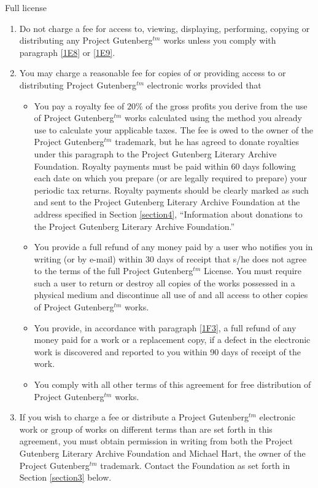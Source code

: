 \begin{chapter}{Full license}
\begin{enumerate}
\begin{enumerate}
\item \label{1E7}Do not charge a fee for access to, viewing, displaying,
performing, copying or distributing any Project Gutenberg$^{tm}$ works
unless you comply with paragraph \ref{1E8} or \ref{1E9}.

\item \label{1E8}You may charge a reasonable fee for copies of or providing
access to or distributing Project Gutenberg$^{tm}$ electronic works provided
that
\begin{itemize}
\item You pay a royalty fee of $20\%$ of the gross profits you derive from
     the use of Project Gutenberg$^{tm}$ works calculated using the method
     you already use to calculate your applicable taxes.  The fee is
     owed to the owner of the Project Gutenberg$^{tm}$ trademark, but he
     has agreed to donate royalties under this paragraph to the
     Project Gutenberg Literary Archive Foundation.  Royalty payments
     must be paid within 60 days following each date on which you
     prepare (or are legally required to prepare) your periodic tax
     returns.  Royalty payments should be clearly marked as such and
     sent to the Project Gutenberg Literary Archive Foundation at the
     address specified in Section \ref{section4}, ``Information about donations
     to the Project Gutenberg Literary Archive Foundation.''

\item You provide a full refund of any money paid by a user who notifies
     you in writing (or by e-mail) within 30 days of receipt that s/he
     does not agree to the terms of the full Project Gutenberg$^{tm}$
     License.  You must require such a user to return or
     destroy all copies of the works possessed in a physical medium
     and discontinue all use of and all access to other copies of
     Project Gutenberg$^{tm}$ works.

\item You provide, in accordance with paragraph \ref{1F3}, a full refund of any
     money paid for a work or a replacement copy, if a defect in the
     electronic work is discovered and reported to you within 90 days
     of receipt of the work.

\item You comply with all other terms of this agreement for free
     distribution of Project Gutenberg$^{tm}$ works.
\end{itemize}

\item \label{1E9}If you wish to charge a fee or distribute a Project
Gutenberg$^{tm}$ electronic work or group of works on different terms than are set
forth in this agreement, you must obtain permission in writing from
both the Project Gutenberg Literary Archive Foundation and Michael
Hart, the owner of the Project Gutenberg$^{tm}$ trademark.  Contact the
Foundation as set forth in Section \ref{section3} below.
\end{enumerate}


\end{enumerate}
\end{chapter}
